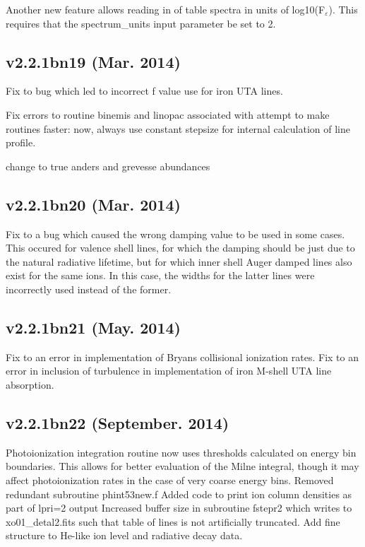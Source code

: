 Another new feature allows reading in of table spectra in units 
of log10(F$_\varepsilon$).  This requires that the spectrum\_units
input parameter be set to 2.

\subsection{v2.2.1bn19 (Mar. 2014)}

Fix to bug which led to incorrect f value use for iron UTA lines.

Fix errors to routine binemis and linopac associated with 
attempt to make routines faster:  now, always use constant 
stepsize for internal calculation of line profile.

change to true anders and grevesse abundances

\subsection{v2.2.1bn20 (Mar. 2014)}

Fix to a bug which caused the wrong damping value to be used in some 
cases.  This occured for valence shell lines, for which the damping 
should be just due to the natural radiative lifetime, but for which 
inner shell Auger damped lines also exist for the same ions.  In this 
case, the widths for the latter lines were incorrectly used instead of the 
former.

\subsection{v2.2.1bn21 (May. 2014)}

Fix to an error in implementation of Bryans collisional ionization rates.
Fix to an error in inclusion of turbulence in implementation of iron M-shell 
UTA line absorption.

\subsection{v2.2.1bn22 (September. 2014)}

Photoionization integration routine now uses thresholds calculated on 
energy bin boundaries.  This allows for better evaluation of the Milne 
integral, though it may affect photoionization rates in the case of very coarse
energy bins.
Removed redundant subroutine phint53new.f
Added code to print ion column densities as part of lpri=2 output
Increased buffer size in subroutine fstepr2 which writes to xo01\_detal2.fits 
such that table of lines is not artificially truncated.
Add fine structure to He-like ion level and radiative decay data.

